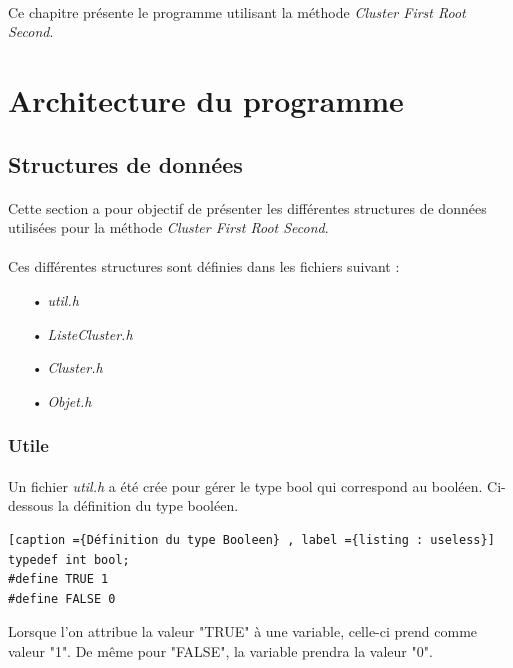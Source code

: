 \documentclass[twoside,UTF8]{EPURapport}
\begin{document}
\paragraph{} Ce chapitre présente le programme utilisant la méthode \textit{Cluster First Root Second}. 

\section{Architecture du programme}
\subsection{Structures de données}
\paragraph{} Cette section a pour objectif de présenter les différentes structures de données utilisées pour la méthode \textit{Cluster First Root Second}.

\paragraph{}Ces différentes structures sont définies dans les fichiers suivant : 
\begin{itemize}
\item[•] \textit{util.h}
\item[•]\textit{ListeCluster.h}
\item[•]\textit{Cluster.h}
\item[•]\textit{Objet.h}
\end{itemize}
\subsubsection{Utile}

\paragraph{}
Un fichier \textit{util.h} a été crée pour gérer le type bool qui correspond au booléen. 
Ci-dessous la définition du type booléen. 
\begin{lstlisting}[caption ={Définition du type Booleen} , label ={listing : useless}]
typedef int bool;
#define TRUE 1
#define FALSE 0
\end{lstlisting}

Lorsque l'on attribue la valeur "TRUE" à une variable, celle-ci prend comme valeur "1". De m\^eme pour "FALSE", la variable prendra la valeur "0".
\end{document}
